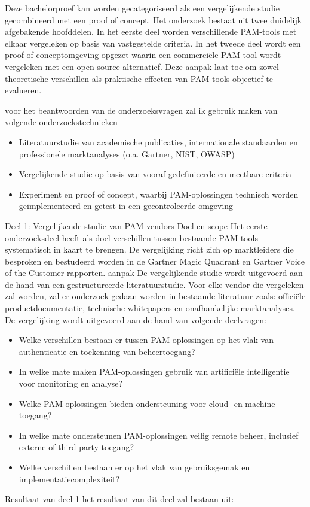 Deze bachelorproef kan worden gecategoriseerd als een vergelijkende studie gecombineerd met een proof of concept. Het onderzoek bestaat uit twee duidelijk afgebakende hoofddelen. In het eerste deel worden verschillende PAM-tools met elkaar vergeleken op basis van vastgestelde criteria. In het tweede deel wordt een proof-of-conceptomgeving opgezet waarin een commerciële PAM-tool wordt vergeleken met een open-source alternatief. Deze aanpak laat toe om zowel theoretische verschillen als praktische effecten van PAM-tools objectief te evalueren.

voor het beantwoorden van de onderzoeksvragen zal ik gebruik maken van volgende onderzoekstechnieken

\begin{itemize}
	\item Literatuurstudie van academische publicaties, internationale standaarden en professionele marktanalyses (o.a. Gartner, NIST, OWASP)
	\item Vergelijkende studie op basis van vooraf gedefinieerde en meetbare criteria
	\item Experiment en proof of concept, waarbij PAM-oplossingen technisch worden geïmplementeerd en getest in een gecontroleerde omgeving
\end{itemize}


Deel 1: Vergelijkende studie van PAM-vendors
Doel en scope
Het eerste onderzoeksdeel heeft als doel verschillen tussen bestaande PAM-tools systematisch in kaart te brengen. De vergelijking richt zich op marktleiders die besproken en bestudeerd worden in de Gartner Magic Quadrant en Gartner Voice of the Customer-rapporten. 
aanpak
De vergelijkende studie wordt uitgevoerd aan de hand van een gestructureerde literatuurstudie. Voor elke vendor die vergeleken zal worden, zal er onderzoek gedaan worden in bestaande literatuur zoals: officiële productdocumentatie, technische whitepapers en onafhankelijke marktanalyses.
De vergelijking wordt uitgevoerd aan de hand van volgende deelvragen:
\begin{itemize}
	\item Welke verschillen bestaan er tussen PAM-oplossingen op het vlak van authenticatie en toekenning van beheertoegang?
	\item In welke mate maken PAM-oplossingen gebruik van artificiële intelligentie voor monitoring en analyse?
	\item Welke PAM-oplossingen bieden ondersteuning voor cloud- en machine-toegang?
	\item In welke mate ondersteunen PAM-oplossingen veilig remote beheer, inclusief externe of third-party toegang?
	\item Welke verschillen bestaan er op het vlak van gebruiksgemak en implementatiecomplexiteit?
\end{itemize}
Resultaat van deel 1
het resultaat van dit deel zal bestaan uit:

